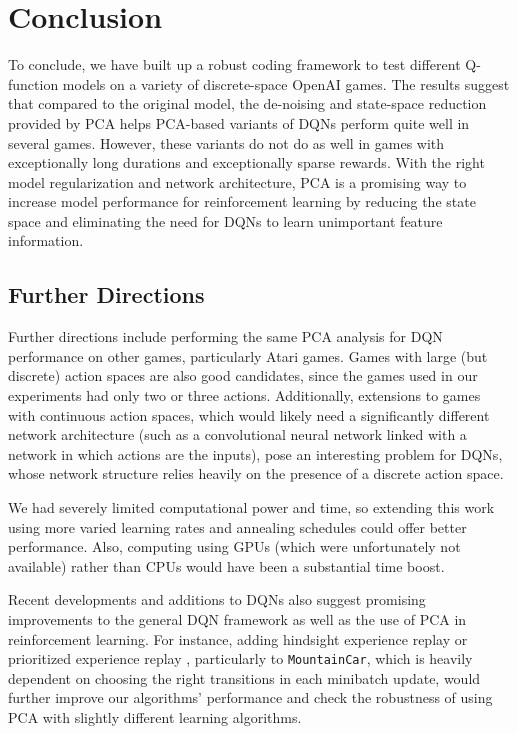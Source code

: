 \documentclass[11pt]{article}
\newcommand{\mc}{\texttt{MountainCar}}
\begin{document}
\section{Conclusion}

To conclude, we have built up a robust coding framework to test different Q-function models on a variety of discrete-space OpenAI games. The results suggest that compared to the original model, the de-noising and state-space reduction provided by PCA helps PCA-based variants of DQNs perform quite well in several games. However, these variants do not do as well in games with exceptionally long durations and exceptionally sparse rewards. With the right model regularization and network architecture, PCA is a promising way to increase model performance for reinforcement learning by reducing the state space and eliminating the need for DQNs to learn unimportant feature information.

\subsection{Further Directions}

Further directions include performing the same PCA analysis for DQN performance on other games, particularly Atari games. Games with large (but discrete) action spaces are also good candidates, since the games used in our experiments had only two or three actions. Additionally, extensions to games with continuous action spaces, which would likely need a significantly different network architecture (such as a convolutional neural network linked with a network in which actions are the inputs), pose an interesting problem for DQNs, whose network structure relies heavily on the presence of a discrete action space.

We had severely limited computational power and time, so extending this work using more varied learning rates and annealing schedules could offer better performance. Also, computing using GPUs (which were unfortunately not available) rather than CPUs would have been a substantial time boost.

Recent developments and additions to DQNs also suggest promising improvements to the general DQN framework as well as the use of PCA in reinforcement learning. For instance, adding hindsight experience replay \cite{andrychowicz2017hindsight} or prioritized experience replay \cite{schaul2015prioritized}, particularly to \mc, which is heavily dependent on choosing the right transitions in each minibatch update, would further improve our algorithms' performance and check the robustness of using PCA with slightly different learning algorithms.
\end{document}

